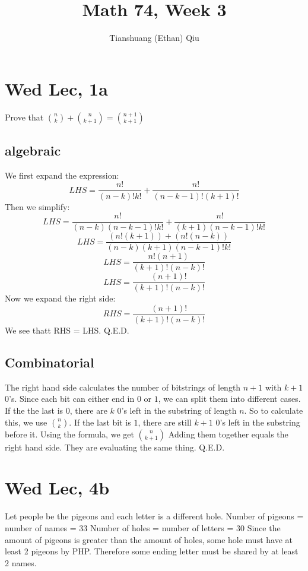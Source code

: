 \documentclass[12pt]{article}
\author{Tianshuang (Ethan) Qiu}
\begin{document}
\title{Math 74, Week 3}
\maketitle

\section{Wed Lec, 1a}
Prove that $\binom{n}{k} + \binom{n}{k+1} = \binom{n+1}{k+1}$
\subsection{algebraic}
We first expand the expression:
$$LHS = \frac{n!}{(n-k)!k!} + \frac{n!}{(n-k-1)!(k+1)!}$$
Then we simplify:
$$LHS = \frac{n!}{(n-k)(n-k-1)!k!} + \frac{n!}{(k+1)(n-k-1)!k!}$$
$$LHS = \frac{(n!(k+1))+(n!(n-k))}{(n-k)(k+1)(n-k-1)!k!} $$
$$LHS = \frac{n!(n+1)}{(k+1)!(n-k)!} $$
$$LHS = \frac{(n+1)!}{(k+1)!(n-k)!}$$
Now we expand the right side:
$$RHS = \frac{(n+1)!}{(k+1)!(n-k)!}$$
We see thatt RHS = LHS.
\newline
Q.E.D.

\subsection{Combinatorial}
The right hand side calculates the number of bitstrings of length $n+1$ with $k+1$ 0's. Since each bit can either end in $0$ or $1$, we can split them into different cases.
\newline
If the the last is $0$, there are $k$ 0's left in the substring of length $n$. So to calculate this, we use $\binom{n}{k}$.
\newline
If the last bit is $1$, there are still $k+1$ 0's left in the substring before it. Using the formula, we get $\binom {n}{k+1}$
\newline
Adding them together equals the right hand side. They are evaluating the same thing.
\newline
Q.E.D.

\section{Wed Lec, 4b}
Let people be the pigeons and each letter is a different hole.
\newline
Number of pigeons = number of names = 33
\newline
Number of holes = number of letters = 30
\newline
Since the amount of pigeons is greater than the amount of holes, some hole must have at least 2 pigeons by PHP. Therefore some ending letter must be shared by at least 2 names.
\end{document}
